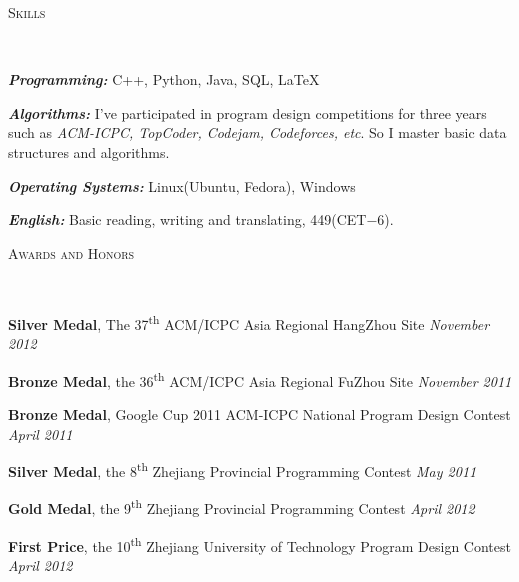 ﻿\documentclass[9pt]{article}
\newenvironment{changemargin}[2]{%
  \begin{list}{}{%
    \setlength{\topsep}{0pt}%
    \setlength{\leftmargin}{#1}%
    \setlength{\rightmargin}{#2}%
    \setlength{\listparindent}{\parindent}%
    \setlength{\itemindent}{\parindent}%
    \setlength{\parsep}{\parskip}%
  }%
  \item[]}{\end{list}
}
\newcommand{\lineover}{
	\begin{changemargin}{-0.05in}{-0.05in}
		\vspace*{-8pt}
		\hrulefill \\
		\vspace*{-2pt}
	\end{changemargin}
}
\newcommand{\header}[1]{
	\begin{changemargin}{-0.5in}{-0.5in}
		\scshape{#1}\\
  	\lineover
	\end{changemargin}
}
\newenvironment{body} {
	\vspace*{-16pt}
	\begin{changemargin}{-0.25in}{-0.5in}
  }	
	{\end{changemargin}
}
\newcommand\nth{\textsuperscript{th}} %
\begin{document}
\smallskip


\header{Skills}

\begin{body}
	\vspace{14pt}
	\emph{\textbf{Programming:}}{} C++, Python, Java, SQL, \LaTeX \\
	\medskip

    \emph{\textbf{Algorithms:}}{} I've participated in program design competitions for three years such as \emph{ACM-ICPC,
TopCoder, Codejam, Codeforces, etc}. So I master basic data structures and algorithms.\\
	\medskip

	\emph{\textbf{Operating Systems:}}{} Linux(Ubuntu, Fedora), Windows \\
    \medskip

    \emph{\textbf{English:}}{} Basic reading, writing and translating, 449(CET$-$6).\\
\end{body}

\smallskip

\header{Awards and Honors}

\begin{body}
	\vspace{14pt}

	\textbf{Silver Medal}, The 37\nth{} ACM/ICPC Asia Regional HangZhou Site \hfill{} \emph{November 2012}\\
	\smallskip

	\textbf{Bronze Medal}, the 36\nth{} ACM/ICPC Asia Regional FuZhou Site \hfill{} \emph{November 2011}\\
	\smallskip

	\textbf{Bronze Medal}, Google Cup 2011 ACM-ICPC National Program Design Contest \hfill{} \emph{April 2011}\\
	\smallskip

	\textbf{Silver Medal}, the 8\nth{} Zhejiang Provincial Programming Contest \hfill{} \emph{May 2011}\\
	\smallskip

	\textbf{Gold Medal}, the 9\nth{} Zhejiang Provincial Programming Contest \hfill{} \emph{April 2012}\\
	\smallskip

	\textbf{First Price}, the 10\nth{} Zhejiang University of Technology Program Design Contest \hfill{} \emph{April 2012}\\
\end{body}
\end{document}
